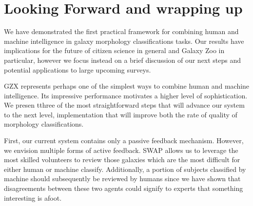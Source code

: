 \documentclass[twocolumn]{aastex6}
\newcommand{\feat}{`Featured'}
\newcommand{\notfeat}{`Not'}
\begin{document}
\section{Looking Forward and wrapping up}\label{sec: visions}

We have demonstrated the first practical framework for combining human and machine
 intelligence in galaxy morphology classifications tasks. 
Our results have implications for the future of citizen science in general and 
Galaxy Zoo in particular, however we focus instead on a brief discussion of our next 
steps and potential applications to large upcoming surveys. 

GZX represents perhaps one of the simplest ways to combine human
and machine intelligence. Its impressive performance motivates a higher 
level of sophistication. We presen tthree of the most 
straightforward steps that will advance our system to the next level, implementation
that will improve both the rate of quality of morphology classifications. 

First, our current system contains only a passive feedback mechanism. However,  
we envision multiple forms of active feedback.  SWAP allows us to leverage the 
most skilled volunteers to review those galaxies which are the most difficult for either
 human or machine classify. Additionally, a portion of subjects classified by machine 
should subsequently be reviewed by humans since we have shown that disagreements 
between these two agents could signify to experts that something interesting is afoot. 
\end{document}
